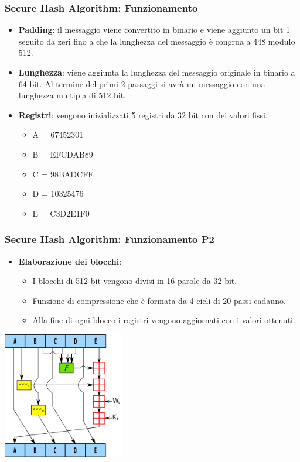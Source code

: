 \begin{frame}
\frametitle{Secure Hash Algorithm: Funzionamento}
\begin{itemize}
    \item \textbf{Padding}: il messaggio viene convertito in binario e viene aggiunto un bit 1 seguito da zeri fino a che la lunghezza del messaggio è congrua a 448 modulo 512.
    \item \textbf{Lunghezza}: viene aggiunta la lunghezza del messaggio originale in binario a 64 bit.
    Al termine del primi 2 passaggi si avrà un messaggio con una lunghezza multipla di 512 bit.
    \item \textbf{Registri}: vengono inizializzati 5 registri da 32 bit con dei valori fissi.
    \begin{itemize}
        \item A = 67452301
        \item B = EFCDAB89
        \item C = 98BADCFE
        \item D = 10325476
        \item E = C3D2E1F0
    \end{itemize}
\end{itemize}
\end{frame}

\begin{frame}
\frametitle{Secure Hash Algorithm: Funzionamento P2}
\begin{itemize}
    \item \textbf{Elaborazione dei blocchi}: 
    \begin{itemize}
        \item I blocchi di 512 bit vengono divisi in 16 parole da 32 bit.
        \item Funzione di compressione che è formata da 4 cicli di 20 passi cadauno.
        \item Alla fine di ogni blocco i registri vengono aggiornati con i valori ottenuti.
    \end{itemize}
\end{itemize}

\begin{center}
    \includegraphics[width=0.4\textwidth]{img/1-img/SHA-1.png}
\end{center}

\end{frame}

